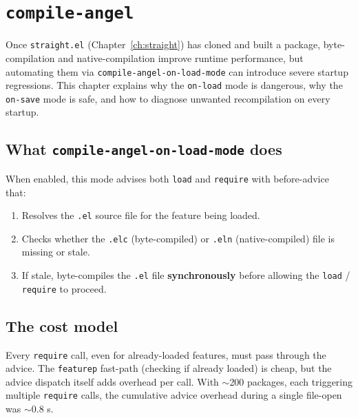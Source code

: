 \chapter{\texttt{compile-angel}}
\label{ch:compile-angel}
\minitoc\label{compile-angel}

Once \texttt{straight.el} (Chapter~\ref{ch:straight}) has cloned and
built a package, byte-compilation and native-compilation improve runtime performance,
but automating them via \texttt{compile-angel-on-load-mode} can
introduce severe startup regressions.  This chapter explains why the
\texttt{on-load} mode is dangerous, why the \texttt{on-save} mode is
safe, and how to diagnose unwanted recompilation on every startup.

\section{What \texttt{compile-angel-on-load-mode} does}\label{what-compile-angel-on-load-mode-does}

When enabled, this mode advises both \texttt{load} and \texttt{require} with before-advice that:

\begin{enumerate}
\item Resolves the \texttt{.el} source file for the feature being loaded.
\item Checks whether the \texttt{.elc} (byte-compiled) or \texttt{.eln} (native-compiled) file is missing or stale.
\item If stale, byte-compiles the \texttt{.el} file \textbf{synchronously} before allowing the \texttt{load} / \texttt{require} to proceed.
\end{enumerate}

\section{The cost model}\label{the-cost-model}

Every \texttt{require} call, even for already-loaded features, must pass through the advice. The \texttt{featurep} fast-path (checking if already loaded) is cheap, but the advice dispatch itself adds overhead per call. With \(\sim\)200 packages, each triggering multiple \texttt{require} calls, the cumulative advice overhead during a single file-open was \(\sim\)0.8 s.

